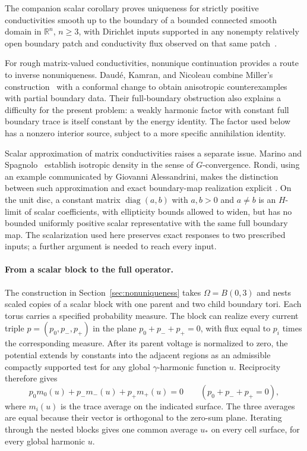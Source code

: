 \documentclass[11pt]{article}
\numberwithin{equation}{section}
\theoremstyle{definition}
\theoremstyle{remark}
\DeclareMathOperator{\diag}{diag}
\begin{document}
The companion scalar corollary proves uniqueness for strictly positive
conductivities smooth up to the boundary of a bounded connected smooth
domain in $\mathbb R^n$, $n\ge3$, with Dirichlet inputs supported in any
nonempty relatively open boundary patch and conductivity flux observed on
that same patch~\cite[Corollary~1.3]{OpenAISmoothPatch2026}.

For rough matrix-valued conductivities, nonunique continuation provides
a route to inverse nonuniqueness. Daud\'e, Kamran, and Nicoleau
\cite[Theorem~1 and Proposition~1.2]{DaudeKamranNicoleau}
combine Miller's construction~\cite{Miller} with a conformal change
to obtain anisotropic counterexamples with partial boundary data.
Their full-boundary obstruction
\cite[Remark~1.3]{DaudeKamranNicoleau} also explains a difficulty
for the present problem: a weakly harmonic factor with constant full
boundary trace is itself constant by the energy identity. The factor
used below has a nonzero interior source, subject to a more specific
annihilation identity.

Scalar approximation of matrix conductivities raises a separate
issue. Marino and Spagnolo~\cite{MarinoSpagnolo} establish isotropic
density in the sense of $G$-convergence. Rondi, using an example
communicated by Giovanni Alessandrini, makes the distinction between
such approximation and exact boundary-map realization explicit
\cite[Proposition~2.2, Theorem~4.3, and Example~4.4]{Rondi}.
On the unit disc, a constant matrix $\diag(a,b)$ with $a,b>0$ and
$a\ne b$ is an $H$-limit of scalar coefficients, with ellipticity
bounds allowed to widen, but has no bounded uniformly positive scalar
representative with the same full boundary map. The scalarization used
here preserves exact responses to two prescribed inputs; a further
argument is needed to reach every input.

\paragraph{From a scalar block to the full operator.}
The construction in Section~\ref{sec:nonuniqueness} takes
$\Omega=B(0,3)$ and nests scaled copies of a scalar block with one
parent and two child boundary tori. Each torus carries a specified
probability measure. The block can realize every current triple
$p=(p_0,p_-,p_+)$ in the plane $p_0+p_-+p_+=0$, with flux equal to
$p_i$ times the corresponding measure. After its parent voltage is
normalized to zero, the potential extends by constants into the
adjacent regions as an admissible compactly supported test for any
global $\gamma$-harmonic function $u$.
Reciprocity therefore gives
\[
 p_0m_0(u)+p_-m_-(u)+p_+m_+(u)=0
 \qquad(p_0+p_-+p_+=0),
\]
where $m_i(u)$ is the trace average on the indicated surface. The
three averages are equal because their vector is orthogonal to the
zero-sum plane. Iterating through the nested blocks gives one common
average $u_*$ on every cell surface, for every global harmonic $u$.
\end{document}
